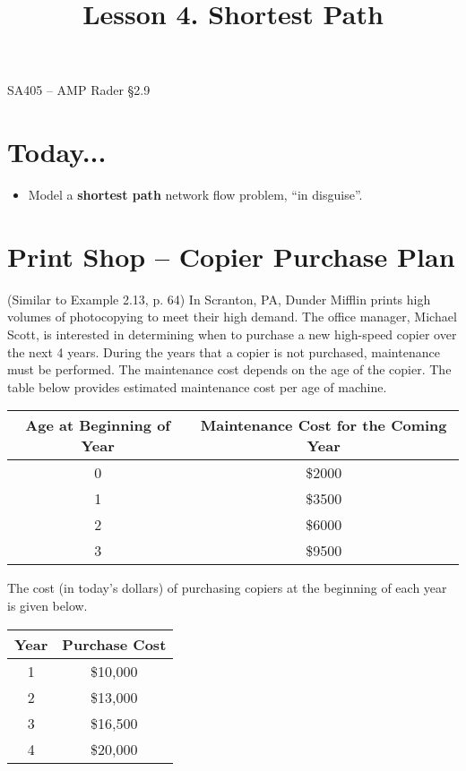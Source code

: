 \documentclass[11pt]{article}
\makeatletter
\theoremstyle{definition}
\renewcommand{\maketitle}{
  \noindent SA405 -- AMP \hfill Rader \S 2.9 \\

  \begin{center}\Large{\textbf{\@title}}\end{center}
}
\makeatother
\begin{document}
  
\title{Lesson 4.  Shortest Path}

\maketitle

\section{Today...}

\begin{itemize}
	\item  Model a \textbf{shortest path} network flow problem, ``in disguise''.  
\end{itemize}

\section{Print Shop -- Copier Purchase Plan}
(Similar to Example 2.13, p. 64) In Scranton, PA, Dunder Mifflin prints high volumes of photocopying to meet their high demand. The office manager, Michael Scott, is interested in determining when to purchase a new high-speed copier over the next 4 years.  During the years that a copier is not purchased, maintenance must be performed.  The maintenance cost depends on the age of the copier.  The table below provides estimated maintenance cost per age of machine.

\begin{center}
\begin{tabular}{cc}
\hline
Age at Beginning of Year & Maintenance Cost for the Coming Year \\
\hline
0 & \$2000 \\
1 & \$3500 \\
2 & \$6000 \\
3 & \$9500 \\
\hline
\end{tabular}
\end{center}

The cost (in today's dollars) of purchasing copiers at the beginning of each year is given below.

\begin{center}
\begin{tabular}{cc}
\hline
Year & Purchase Cost \\
\hline
1 & \$10,000 \\
2 & \$13,000 \\
3 & \$16,500 \\
4 & \$20,000 \\
\hline
\end{tabular}
\end{center}
\end{document}
